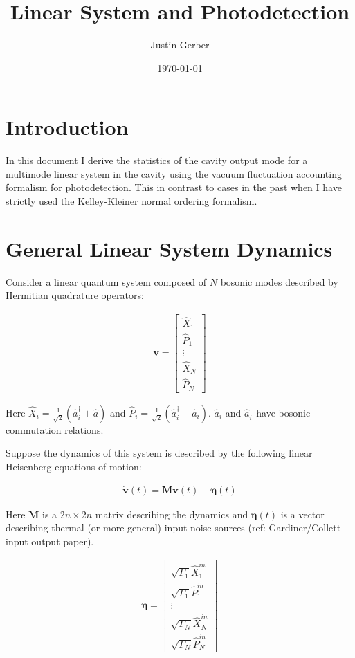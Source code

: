 \documentclass[12pt]{article}
\newcommand{\bv}[1]{\boldsymbol{#1}}
\begin{document}
\title{Linear System and Photodetection}
\author{Justin Gerber}
\date{\today}
\maketitle

\section{Introduction}

In this document I derive the statistics of the cavity output mode for a multimode linear system in the cavity using the vacuum fluctuation accounting formalism for photodetection. This in contrast to cases in the past when I have strictly used the Kelley-Kleiner normal ordering formalism.

\section{General Linear System Dynamics}

Consider a linear quantum system composed of $N$ bosonic modes described by Hermitian quadrature operators:

\begin{align}
\bv{v} = 
\begin{bmatrix}
\hat{X}_1\\\hat{P}_1\\
\vdots\\
\hat{X}_N\\\hat{P}_N
\end{bmatrix}
\end{align}

Here  $\hat{X}_i = \frac{1}{\sqrt{2}}\left(\hat{a}_i^{\dag} + \hat{a} \right)$ and $\hat{P}_i = \frac{1}{\sqrt{2}}\left(\hat{a}_i^{\dag} - \hat{a}_i \right)$. $\hat{a}_i$ and $\hat{a}_i^{\dag}$ have bosonic commutation relations.

Suppose the dynamics of this system is described by the following linear Heisenberg equations of motion:

\begin{align}
\dot{\bv{v}}(t) = \bv{M}\bv{v}(t) - \bv{\eta}(t)
\end{align}

Here $\bv{M}$ is a $2n \times 2n$ matrix describing the dynamics and $\bv{\eta}(t)$ is a vector describing thermal (or more general) input noise sources (ref: Gardiner/Collett input output paper).

\begin{align}
\bv{\eta} = 
\begin{bmatrix}
\sqrt{\Gamma_1}\hat{X}_1^{in}\\\sqrt{\Gamma_1}\hat{P}_1^{in}\\
\vdots\\
\sqrt{\Gamma_N}\hat{X}_N^{in}\\\sqrt{\Gamma_N}\hat{P}_N^{in}
\end{bmatrix}
\end{align}
\end{document}
